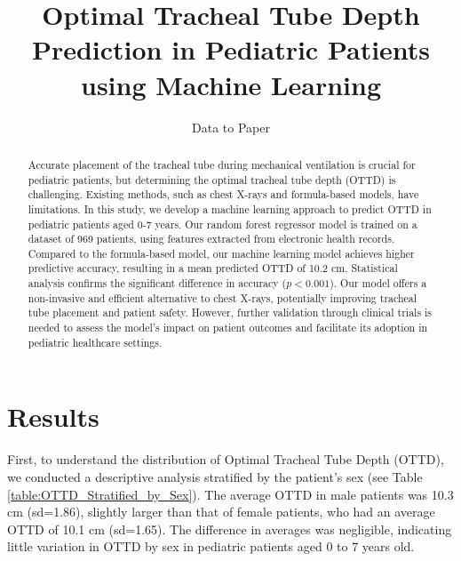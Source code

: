 \documentclass[11pt]{article}
\title{Optimal Tracheal Tube Depth Prediction in Pediatric Patients using Machine Learning}
\author{Data to Paper}
\begin{document}
\maketitle
\begin{abstract}
Accurate placement of the tracheal tube during mechanical ventilation is crucial for pediatric patients, but determining the optimal tracheal tube depth (OTTD) is challenging. Existing methods, such as chest X-rays and formula-based models, have limitations. In this study, we develop a machine learning approach to predict OTTD in pediatric patients aged 0-7 years. Our random forest regressor model is trained on a dataset of 969 patients, using features extracted from electronic health records. Compared to the formula-based model, our machine learning model achieves higher predictive accuracy, resulting in a mean predicted OTTD of 10.2 cm. Statistical analysis confirms the significant difference in accuracy ($p<0.001$). Our model offers a non-invasive and efficient alternative to chest X-rays, potentially improving tracheal tube placement and patient safety. However, further validation through clinical trials is needed to assess the model's impact on patient outcomes and facilitate its adoption in pediatric healthcare settings.
\end{abstract}
\section*{Results}

First, to understand the distribution of Optimal Tracheal Tube Depth (OTTD), we conducted a descriptive analysis stratified by the patient's sex (see Table {}\ref{table:OTTD_Stratified_by_Sex}). The average OTTD in male patients was 10.3 cm (sd=1.86), slightly larger than that of female patients, who had an average OTTD of 10.1 cm (sd=1.65). The difference in averages was negligible, indicating little variation in OTTD by sex in pediatric patients aged 0 to 7 years old.

\begin{table}[h]
\caption{Descriptive statistics of Optimal Tracheal Tube Depth (OTTD) stratified by sex}
\label{table:OTTD_Stratified_by_Sex}
\begin{threeparttable}
\renewcommand{\TPTminimum}{\linewidth}
\begin{tablenotes}
\footnotesize
\item 
\end{tablenotes}
\end{threeparttable}
\end{table}
\end{document}

